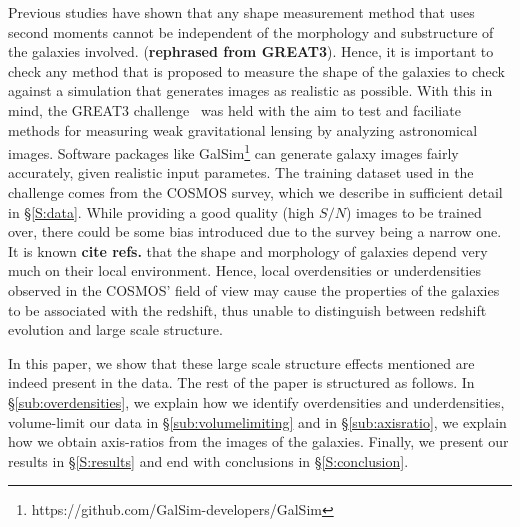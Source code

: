 \documentclass[twocolumn,useAMS,usenatbib]{mn2e}
\begin{document}
Previous studies have shown that any shape measurement method that uses second moments cannot be independent of the morphology and substructure of the galaxies involved. ({\bf rephrased from GREAT3}).
Hence, it is important to check any method that is proposed to measure the shape of the galaxies to check against a simulation that generates images as realistic as possible.  
With this in mind, the GREAT3 challenge~\citep{great3} was held with the aim to test and faciliate methods for measuring weak gravitational lensing by analyzing astronomical images.
Software packages like GalSim\footnote{https://github.com/GalSim-developers/GalSim} can generate galaxy images fairly accurately, given realistic input parametes.
The training dataset used in the challenge comes from the COSMOS survey, which we describe in sufficient detail in \S\ref{S:data}.
While providing a good quality (high $S/N$) images to be trained over, there could be some bias introduced due to the survey being a narrow one.
It is known {\bf cite refs.} that the shape and morphology of galaxies depend very much on their local environment. Hence, local overdensities or underdensities
observed in the COSMOS' field of view may cause the properties of the galaxies to be associated with the redshift, thus unable to distinguish between redshift evolution and large scale structure.

In this paper, we show that these large scale structure effects mentioned are indeed present in the data. The rest of the paper is structured as follows.
In \S\ref{sub:overdensities}, we explain how we identify overdensities and underdensities, volume-limit our data in \S\ref{sub:volumelimiting} and in \S\ref{sub:axisratio},
 we explain how we obtain axis-ratios from the images of the galaxies. Finally, we present our results in \S\ref{S:results} and end with conclusions in \S\ref{S:conclusion}.
\end{document}

